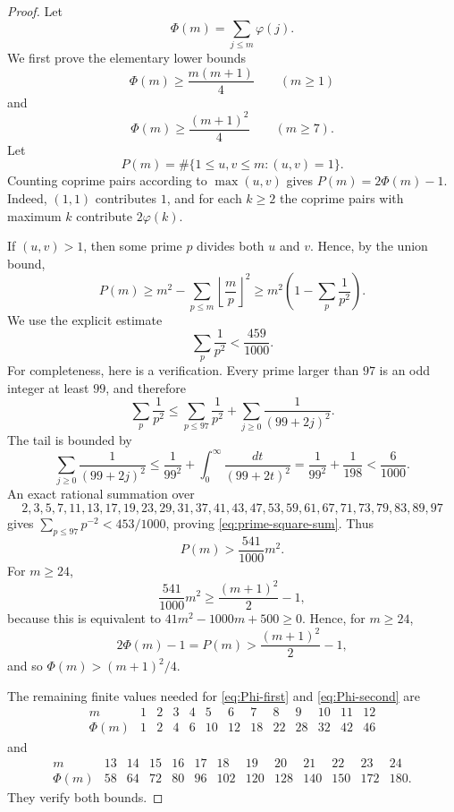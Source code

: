 \documentclass[10pt,a4paper]{amsart}
\begin{document}
\begin{proof}
Let
\[
  \Phi(m)=\sum_{j\le m}\varphi(j).
\]
We first prove the elementary lower bounds
\begin{equation}\label{eq:Phi-first}
  \Phi(m)\ge \frac{m(m+1)}4\qquad(m\ge1)
\end{equation}
and
\begin{equation}\label{eq:Phi-second}
  \Phi(m)\ge \frac{(m+1)^2}{4}\qquad(m\ge7).
\end{equation}
Let
\[
  P(m)=\#\{1\le u,v\le m:(u,v)=1\}.
\]
Counting coprime pairs according to $\max(u,v)$ gives $P(m)=2\Phi(m)-1$.  Indeed, $(1,1)$ contributes $1$, and for each $k\ge2$ the coprime pairs with maximum $k$ contribute $2\varphi(k)$.

If $(u,v)>1$, then some prime $p$ divides both $u$ and $v$.  Hence, by the union bound,
\[
  P(m)\ge m^2-\sum_{p\le m}\left\lfloor\frac mp\right\rfloor^2
        \ge m^2\left(1-\sum_p\frac1{p^2}\right).
\]
We use the explicit estimate
\begin{equation}\label{eq:prime-square-sum}
  \sum_p\frac1{p^2}<\frac{459}{1000}.
\end{equation}
For completeness, here is a verification.  Every prime larger than $97$ is an odd integer at least $99$, and therefore
\[
\sum_p\frac1{p^2}
\le \sum_{p\le97}\frac1{p^2}
   +\sum_{j\ge0}\frac1{(99+2j)^2}.
\]
The tail is bounded by
\[
\sum_{j\ge0}\frac1{(99+2j)^2}
\le \frac1{99^2}+\int_0^\infty\frac{dt}{(99+2t)^2}
=\frac1{99^2}+\frac1{198}<\frac6{1000}.
\]
An exact rational summation over
\[
2,3,5,7,11,13,17,19,23,29,31,37,41,43,47,53,59,61,67,71,73,79,83,89,97
\]
gives $\sum_{p\le97}p^{-2}<453/1000$, proving \eqref{eq:prime-square-sum}.  Thus
\[
  P(m)>\frac{541}{1000}m^2.
\]
For $m\ge24$,
\[
  \frac{541}{1000}m^2\ge\frac{(m+1)^2}{2}-1,
\]
because this is equivalent to $41m^2-1000m+500\ge0$.  Hence, for $m\ge24$,
\[
  2\Phi(m)-1=P(m)>\frac{(m+1)^2}{2}-1,
\]
and so $\Phi(m)>(m+1)^2/4$.

The remaining finite values needed for \eqref{eq:Phi-first} and \eqref{eq:Phi-second} are
\[
\begin{array}{c|rrrrrrrrrrrr}
 m&1&2&3&4&5&6&7&8&9&10&11&12\\ \hline
 \Phi(m)&1&2&4&6&10&12&18&22&28&32&42&46
\end{array}
\]
and
\[
\begin{array}{c|rrrrrrrrrrrr}
 m&13&14&15&16&17&18&19&20&21&22&23&24\\ \hline
 \Phi(m)&58&64&72&80&96&102&120&128&140&150&172&180.
\end{array}
\]
They verify both bounds.


\end{proof}
\end{document}

